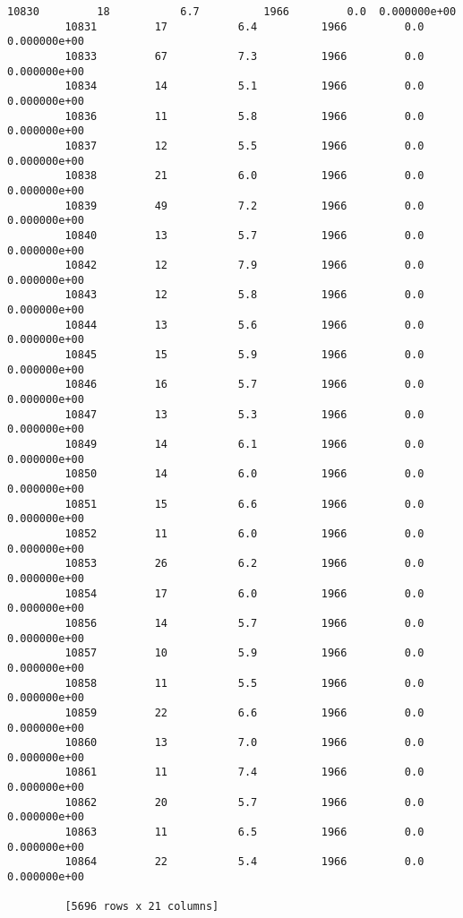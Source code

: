 \documentclass[11pt]{article}
\begin{document}
\begin{Verbatim}[commandchars=\\\{\}]
         10830         18           6.7          1966         0.0  0.000000e+00  
         10831         17           6.4          1966         0.0  0.000000e+00  
         10833         67           7.3          1966         0.0  0.000000e+00  
         10834         14           5.1          1966         0.0  0.000000e+00  
         10836         11           5.8          1966         0.0  0.000000e+00  
         10837         12           5.5          1966         0.0  0.000000e+00  
         10838         21           6.0          1966         0.0  0.000000e+00  
         10839         49           7.2          1966         0.0  0.000000e+00  
         10840         13           5.7          1966         0.0  0.000000e+00  
         10842         12           7.9          1966         0.0  0.000000e+00  
         10843         12           5.8          1966         0.0  0.000000e+00  
         10844         13           5.6          1966         0.0  0.000000e+00  
         10845         15           5.9          1966         0.0  0.000000e+00  
         10846         16           5.7          1966         0.0  0.000000e+00  
         10847         13           5.3          1966         0.0  0.000000e+00  
         10849         14           6.1          1966         0.0  0.000000e+00  
         10850         14           6.0          1966         0.0  0.000000e+00  
         10851         15           6.6          1966         0.0  0.000000e+00  
         10852         11           6.0          1966         0.0  0.000000e+00  
         10853         26           6.2          1966         0.0  0.000000e+00  
         10854         17           6.0          1966         0.0  0.000000e+00  
         10856         14           5.7          1966         0.0  0.000000e+00  
         10857         10           5.9          1966         0.0  0.000000e+00  
         10858         11           5.5          1966         0.0  0.000000e+00  
         10859         22           6.6          1966         0.0  0.000000e+00  
         10860         13           7.0          1966         0.0  0.000000e+00  
         10861         11           7.4          1966         0.0  0.000000e+00  
         10862         20           5.7          1966         0.0  0.000000e+00  
         10863         11           6.5          1966         0.0  0.000000e+00  
         10864         22           5.4          1966         0.0  0.000000e+00  
         
         [5696 rows x 21 columns]
\end{Verbatim}
            
\end{document}
